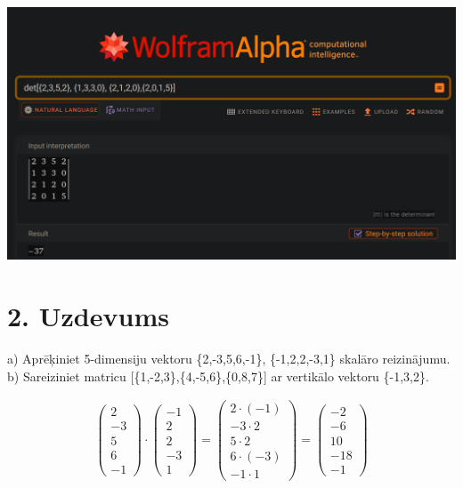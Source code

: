 \documentclass{article}
\begin{document}
\includegraphics[width=\textwidth]{1}

\clearpage

\section*{2. Uzdevums}
a) Aprēķiniet 5-dimensiju vektoru \{2,-3,5,6,-1\}, \{-1,2,2,-3,1\} skalāro reizinājumu. b) Sareiziniet matricu [\{1,-2,3\},\{4,-5,6\},\{0,8,7\}] ar vertikālo vektoru \{-1,3,2\}.

\begin{gather*}
    \begin{pmatrix}
        2\\
        -3\\
        5\\
        6\\
        -1
    \end{pmatrix}
    \cdot
    \begin{pmatrix}
        -1\\
        2\\
        2\\
        -3\\
        1
    \end{pmatrix}
    =
    \begin{pmatrix}
        2 \cdot (-1)\\
        -3 \cdot 2\\
        5 \cdot 2\\
        6 \cdot (-3)\\
        -1 \cdot 1
    \end{pmatrix}
    =
    \begin{pmatrix}
        -2\\
        -6\\
        10\\
        -18\\
        -1
    \end{pmatrix}
\end{gather*}
\end{document}

